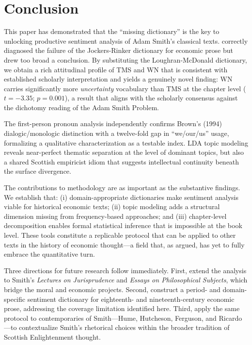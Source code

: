 \documentclass[12pt,a4paper]{article}
\begin{document}
\section{Conclusion}

This paper has demonstrated that the ``missing dictionary'' is the key
to unlocking productive sentiment analysis of Adam Smith's classical
texts.
\citeauthor{Ballandonne2023} correctly diagnosed the failure of the
Jockers-Rinker dictionary for economic prose but drew too broad a
conclusion.
By substituting the Loughran-McDonald dictionary, we obtain a rich
attitudinal profile of TMS and WN that is consistent with established
scholarly interpretation and yields a genuinely novel finding: WN
carries significantly more \textit{uncertainty} vocabulary than TMS at
the chapter level ($t = -3.35$; $p = 0.001$), a result that aligns with
the scholarly consensus against the dichotomy reading of the Adam Smith
Problem.

The first-person pronoun analysis independently confirms Brown's (1994)
dialogic/monologic distinction with a twelve-fold gap in ``we/our/us''
usage, formalizing a qualitative characterization as a testable index.
LDA topic modeling reveals near-perfect thematic separation at the level
of dominant topics, but also a shared Scottish empiricist idiom that
suggests intellectual continuity beneath the surface divergence.

The contributions to methodology are as important as the substantive
findings.
We establish that: (i) domain-appropriate dictionaries make sentiment
analysis viable for historical economic texts; (ii) topic modeling adds
a structural dimension missing from frequency-based approaches; and
(iii) chapter-level decomposition enables formal statistical inference
that is impossible at the book level.
These tools constitute a replicable protocol that can be applied to
other texts in the history of economic thought---a field that, as
\citeauthor{Ballandonne2023} argued, has yet to fully embrace the
quantitative turn.

Three directions for future research follow immediately.
First, extend the analysis to Smith's \textit{Lectures on
Jurisprudence} and \textit{Essays on Philosophical Subjects}, which
bridge the moral and economic projects.
Second, construct a period- and domain-specific sentiment dictionary for
eighteenth- and nineteenth-century economic prose, addressing the
coverage limitation identified here.
Third, apply the same protocol to contemporaries of Smith---Hume,
Hutcheson, Ferguson, and Ricardo---to contextualize Smith's rhetorical
choices within the broader tradition of Scottish Enlightenment thought.
\end{document}
